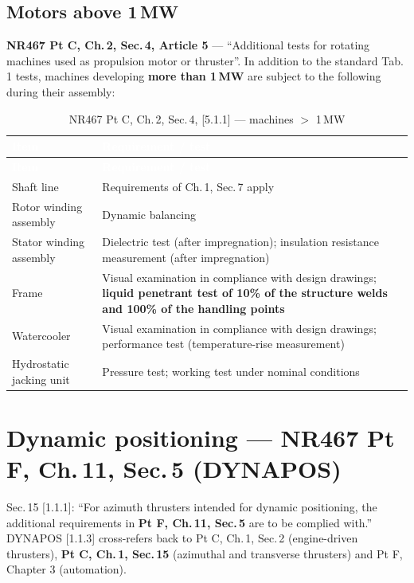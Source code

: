 \documentclass[11pt,a4paper]{report}
\begin{document}
\subsection{Motors above 1\,MW}
\textbf{NR467 Pt C, Ch.\,2, Sec.\,4, Article 5} --- ``Additional tests for
rotating machines used as propulsion motor or thruster''. In addition to the
standard Tab.\,1 tests, machines developing \textbf{more than 1\,MW} are subject
to the following during their assembly:

\begin{longtable}{|p{4.0cm}|p{10.9cm}|}
\caption{NR467 Pt C, Ch.\,2, Sec.\,4, [5.1.1] --- machines $>$ 1\,MW} \label{tab:c2s4a5} \\
\hline
\rowcolor{bvblue}
\textcolor{white}{\textbf{Item}} & \textcolor{white}{\textbf{Requirement / test}} \\
\hline
\endfirsthead
\hline
\rowcolor{bvblue}
\textcolor{white}{\textbf{Item}} & \textcolor{white}{\textbf{Requirement / test}} \\
\hline
\endhead
\hline
\endlastfoot
Shaft line & Requirements of Ch.\,1, Sec.\,7 apply \\
\hline
Rotor winding assembly & Dynamic balancing \\
\hline
Stator winding assembly & Dielectric test (after impregnation); insulation resistance measurement (after impregnation) \\
\hline
Frame & Visual examination in compliance with design drawings; \textbf{liquid penetrant test of 10\% of the structure welds and 100\% of the handling points} \\
\hline
Watercooler & Visual examination in compliance with design drawings; performance test (temperature-rise measurement) \\
\hline
Hydrostatic jacking unit & Pressure test; working test under nominal conditions \\
\hline
\end{longtable}

\newpage

\section{Dynamic positioning --- NR467 Pt F, Ch.\,11, Sec.\,5 (DYNAPOS)}
\label{sec:dpruletable}

Sec.\,15 [1.1.1]: ``For azimuth thrusters intended for dynamic positioning, the
additional requirements in \textbf{Pt F, Ch.\,11, Sec.\,5} are to be complied
with.'' DYNAPOS [1.1.3] cross-refers back to Pt C, Ch.\,1, Sec.\,2 (engine-driven
thrusters), \textbf{Pt C, Ch.\,1, Sec.\,15} (azimuthal and transverse thrusters)
and Pt F, Chapter 3 (automation).
\end{document}
